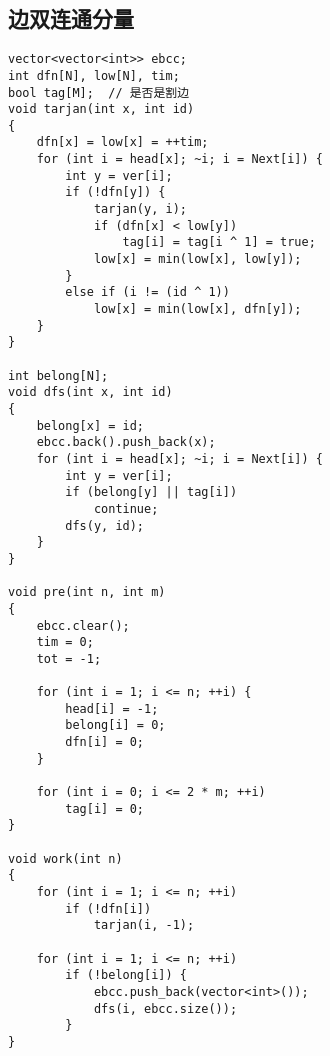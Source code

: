 \documentclass[twocolumn,a4]{article}
\begin{document}
\subsection{边双连通分量}
\begin{lstlisting}
vector<vector<int>> ebcc;
int dfn[N], low[N], tim;
bool tag[M];  // 是否是割边
void tarjan(int x, int id)
{
    dfn[x] = low[x] = ++tim;
    for (int i = head[x]; ~i; i = Next[i]) {
        int y = ver[i];
        if (!dfn[y]) {
            tarjan(y, i);
            if (dfn[x] < low[y])
                tag[i] = tag[i ^ 1] = true;
            low[x] = min(low[x], low[y]);
        }
        else if (i != (id ^ 1))
            low[x] = min(low[x], dfn[y]);
    }
}

int belong[N];
void dfs(int x, int id)
{
    belong[x] = id;
    ebcc.back().push_back(x);
    for (int i = head[x]; ~i; i = Next[i]) {
        int y = ver[i];
        if (belong[y] || tag[i])
            continue;
        dfs(y, id);
    }
}

void pre(int n, int m)
{
    ebcc.clear();
    tim = 0;
    tot = -1;

    for (int i = 1; i <= n; ++i) {
        head[i] = -1;
        belong[i] = 0;
        dfn[i] = 0;
    }

    for (int i = 0; i <= 2 * m; ++i)
        tag[i] = 0;
}

void work(int n)
{
    for (int i = 1; i <= n; ++i)
        if (!dfn[i])
            tarjan(i, -1);

    for (int i = 1; i <= n; ++i)
        if (!belong[i]) {
            ebcc.push_back(vector<int>());
            dfs(i, ebcc.size());
        }
}
\end{lstlisting}
\end{document}
